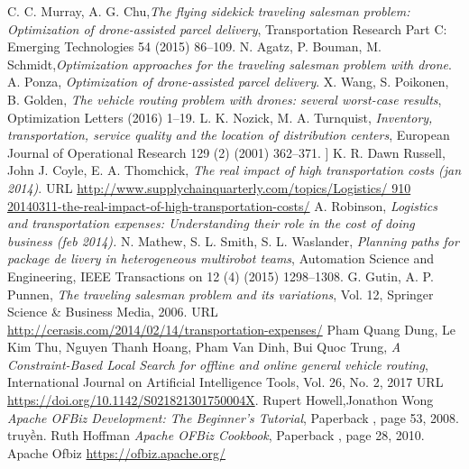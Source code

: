 \documentclass[a4paper,12pt]{report}
\begin{document}
\begin{thebibliography}{9}
 C. C. Murray, A. G. Chu,\textit{The flying sidekick traveling salesman problem:
Optimization of drone-assisted parcel delivery}, Transportation Research
Part C: Emerging Technologies 54 (2015) 86–109.
 N. Agatz, P. Bouman, M. Schmidt,\textit{Optimization approaches for the traveling salesman problem with drone}.
 A. Ponza, \textit{Optimization of drone-assisted parcel delivery}.
 X. Wang, S. Poikonen, B. Golden,\textit{ The vehicle routing problem with
drones: several worst-case results}, Optimization Letters (2016) 1–19.
 L. K. Nozick, M. A. Turnquist,\textit{ Inventory, transportation, service quality and the location of distribution centers}, European Journal of Operational
Research 129 (2) (2001) 362–371.
] K. R. Dawn Russell, John J. Coyle, E. A. Thomchick, \textit{The real impact of
high transportation costs (jan 2014)}.
URL \url{http://www.supplychainquarterly.com/topics/Logistics/
910 20140311-the-real-impact-of-high-transportation-costs/}
 A. Robinson, \textit{ Logistics and transportation expenses: Understanding their
role in the cost of doing business (feb 2014).}
 N. Mathew, S. L. Smith, S. L. Waslander, \textit{ Planning paths for package de
livery in heterogeneous multirobot teams}, Automation Science and Engineering,
IEEE Transactions on 12 (4) (2015) 1298–1308.
 G. Gutin, A. P. Punnen, \textit{ The traveling salesman problem and its variations}, Vol. 12, Springer Science \& Business Media, 2006.
URL \url{http://cerasis.com/2014/02/14/transportation-expenses/}
 Pham Quang Dung, Le Kim Thu, Nguyen Thanh Hoang, Pham Van Dinh, Bui Quoc Trung, \textit{ A Constraint-Based Local Search for offline and online general vehicle routing}, International Journal on Artificial Intelligence Tools, Vol. 26, No. 2, 2017
URL \url{https://doi.org/10.1142/S021821301750004X}.
Rupert Howell,Jonathon Wong
\textit{Apache OFBiz Development: The Beginner's Tutorial}, Paperback , page 53,  2008.
truyền.
 Ruth Hoffman
\textit{Apache OFBiz Cookbook}, Paperback , page 28, 2010.
 Apache Ofbiz
\url{https://ofbiz.apache.org/}

\end{thebibliography}
\end{document}
